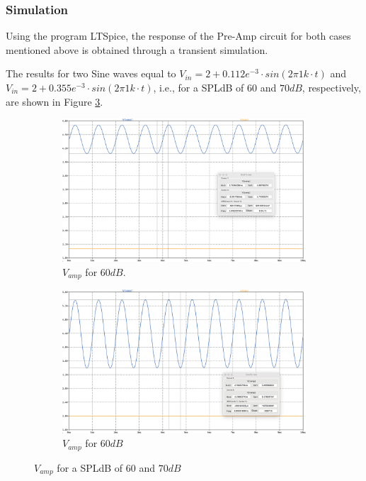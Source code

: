 \subsubsection{Simulation}

Using the program LTSpice, the response of the Pre-Amp circuit for both cases mentioned above is obtained through a transient simulation.

The results for two Sine waves equal to $V_{in} = 2 + 0.112e^{-3} \cdot sin(2\pi 1k \cdot t)$ and $V_{in} = 2 + 0.355e^{-3} \cdot sin(2\pi 1k \cdot t)$, i.e., for a SPLdB of $60$ and $70 dB$, respectively, are shown in Figure \ref{fig:SimPreAmp}.

\begin{figure}[H]
    \centering
    \begin{subfigure}{0.45\textwidth}
        \includegraphics*[width=\textwidth]{Images/SimAmp112.png}
        \caption{$V_{amp}$ for $60dB$.}
        \label{fig:SimAmp112}  
    \end{subfigure}
    \begin{subfigure}{0.45\textwidth}
        \includegraphics*[width=\textwidth]{Images/SimAmp355.png}
        \caption{$V_{amp}$ for $60dB$}
        \label{fig:SimAmp355}    
    \end{subfigure}
    \caption{$V_{amp}$ for a SPLdB of $60$ and $70dB$}
    \label{fig:SimPreAmp}
\end{figure}

